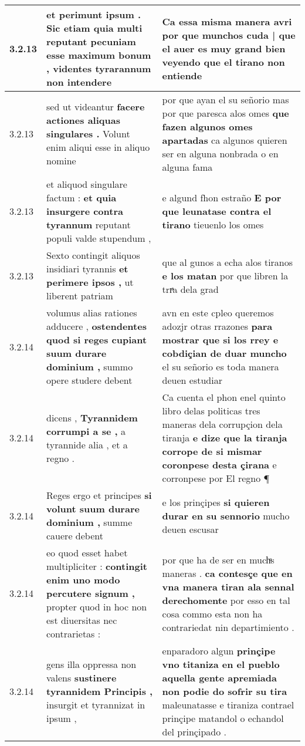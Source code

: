 \begin{tabular}{|p{1cm}|p{6.5cm}|p{6.5cm}|}
3.2.13 & et perimunt ipsum . \textbf{ Sic etiam quia multi reputant pecuniam esse maximum bonum , } videntes tyrarannum non intendere & Ca essa misma manera avri \textbf{ por que munchos cuda | que el auer es muy grand bien veyendo } que el tirano non entiende \\\hline
3.2.13 & sed ut videantur \textbf{ facere actiones aliquas singulares . } Volunt enim aliqui esse in aliquo nomine & por que ayan el su señorio mas por que paresca alos omes \textbf{ que fazen algunos omes apartadas } ca algunos quieren ser en alguna nonbrada o en alguna fama \\\hline
3.2.13 & et aliquod singulare factum : \textbf{ et quia insurgere contra tyrannum } reputant populi valde stupendum , & e algund fhon estraño \textbf{ E por que leunatase contra el tirano } tieuenlo los omes \\\hline
3.2.13 & Sexto contingit aliquos insidiari tyrannis \textbf{ et perimere ipsos , } ut liberent patriam & que al gunos a echa alos tiranos \textbf{ e los matan } por que libren la trrͣa dela grad \\\hline
3.2.14 & volumus alias rationes adducere , \textbf{ ostendentes quod si reges cupiant suum durare dominium , } summo opere studere debent & avn en este cpleo queremos adozjr otras rrazones \textbf{ para mostrar que si los rrey e cobdiçian de duar muncho } el su señorio es toda manera deuen estudiar \\\hline
3.2.14 & dicens , \textbf{ Tyrannidem corrumpi a se , } a tyrannide alia , et a regno . & Ca cuenta el phon enel quinto libro delas politicas tres maneras dela corrupçion dela tiranja \textbf{ e dize que la tiranja corrope de si mismar coronpese desta çirana } e corronpese por El regno ¶ \\\hline
3.2.14 & Reges ergo et principes \textbf{ si volunt suum durare dominium , } summe cauere debent & e los prinçipes \textbf{ si quieren durar en su sennorio } mucho deuen escusar \\\hline
3.2.14 & eo quod esset habet multipliciter : \textbf{ contingit enim uno modo percutere signum , } propter quod in hoc non est diuersitas nec contrarietas : & por que ha de ser en muchͣs maneras . \textbf{ ca contesçe que en vna manera tiran ala sennal derechomente } por esso en tal cosa commo esta non ha contrariedat nin departimiento . \\\hline
3.2.14 & gens illa oppressa non valens \textbf{ sustinere tyrannidem Principis , } insurgit et tyrannizat in ipsum , & enparadoro algun \textbf{ prinçipe vno titaniza en el pueblo aquella gente apremiada non podie do sofrir su tira } maleunatasse e tiraniza contrael prinçipe matandol o echandol del prinçipado . \\\hline

\end{tabular}
